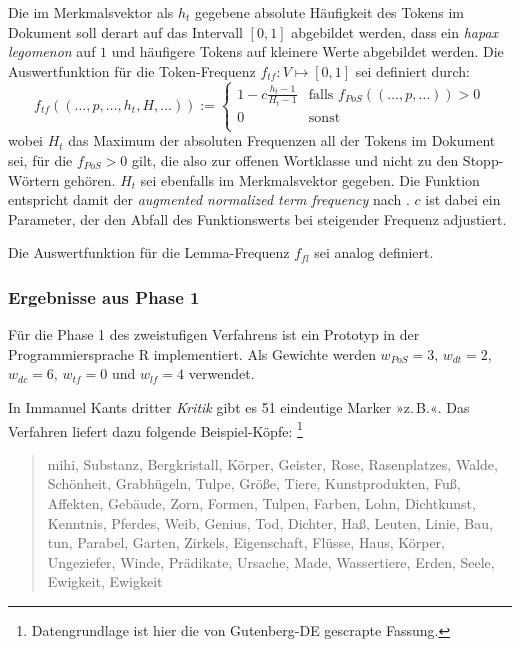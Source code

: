 \documentclass{article}
\newcommand*{\lit}{\textit}%
\newcommand*{\englisch}[1]{\foreignlanguage{english}{\textit{#1}}}%
\newcommand*{\latein}{\textit}%
\begin{document}
Die im Merkmalsvektor als $h_t$ gegebene absolute Häufigkeit des
Tokens im Dokument soll derart auf das Intervall $[0,1]$ abgebildet
werden, dass ein \latein{hapax legomenon} auf $1$ und häufigere Tokens
auf kleinere Werte abgebildet werden. Die Auswertfunktion für die
Token-Frequenz $f_{tf}:V\mapsto [0,1]$ sei definiert durch:
\begin{equation}
  \label{eq:tokenfreq}
  f_{tf}((\dots,p,\dots,h_t,H,\dots)) := \left\{
    \begin{array}{ll}
      1-c\frac{h_t-1}{H_t-1} & \textrm{falls } f_{PoS}((\dots,p,\dots)) > 0\\
      0 & \mathrm{sonst} \\
    \end{array}\right.
\end{equation}
wobei $H_t$ das Maximum der absoluten Frequenzen all der Tokens im
Dokument sei, für die $f_{PoS}>0$ gilt, die also zur offenen
Wortklasse und nicht zu den Stopp-Wörtern gehören. $H_t$ sei ebenfalls
im Merkmalsvektor gegeben. Die Funktion entspricht damit der
\englisch{augmented normalized term frequency} nach
\textcite[518]{Salton1988a}. $c$ ist dabei ein Parameter, der den
Abfall des Funktionswerts bei steigender Frequenz adjustiert.

Die Auswertfunktion für die Lemma-Frequenz $f_{fl}$ sei analog
definiert.

\subsubsection{Ergebnisse aus Phase 1}

Für die Phase 1 des zweistufigen Verfahrens ist ein Prototyp in der
Programmiersprache R implementiert. Als Gewichte werden $w_{PoS}=3$,
$w_{dt}=2$, $w_{dc}=6$, $w_{tf}=0$ und $w_{lf}=4$ verwendet.

In Immanuel Kants dritter \lit{Kritik} gibt es 51 eindeutige Marker
»z.\,B.«. Das Verfahren liefert dazu folgende Beispiel-Köpfe:%
\footnote{Datengrundlage ist hier die von Gutenberg-DE gescrapte
  Fassung.} %
\begin{quote}
  mihi, Substanz, Bergkristall, Körper, Geister, Rose, Rasenplatzes,
  Walde, Schönheit, Grabhügeln, Tulpe, Größe, Tiere, Kunstprodukten,
  Fuß, Affekten, Gebäude, Zorn, Formen, Tulpen, Farben, Lohn,
  Dichtkunst, Kenntnis, Pferdes, Weib, Genius, Tod, Dichter, Haß,
  Leuten, Linie, Bau, tun, Parabel, Garten, Zirkels, Eigenschaft,
  Flüsse, Haus, Körper, Ungeziefer, Winde, Prädikate, Ursache, Made,
  Wassertiere, Erden, Seele, Ewigkeit, Ewigkeit
\end{quote}
\end{document}
